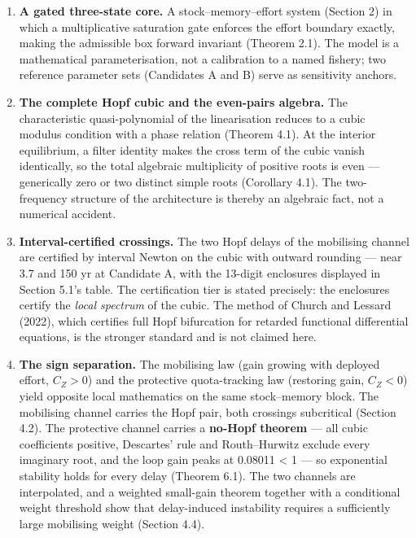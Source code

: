 \documentclass[11pt]{article}
\begin{document}
\begin{enumerate}
\def\labelenumi{\arabic{enumi}.}
\item
  \textbf{A gated three-state core.} A stock--memory--effort system
  (Section 2) in which a multiplicative saturation gate enforces the
  effort boundary exactly, making the admissible box forward invariant
  (Theorem 2.1). The model is a mathematical parameterisation, not a
  calibration to a named fishery; two reference parameter sets
  (Candidates A and B) serve as sensitivity anchors.
\item
  \textbf{The complete Hopf cubic and the even-pairs algebra.} The
  characteristic quasi-polynomial of the linearisation reduces to a
  cubic modulus condition with a phase relation (Theorem 4.1). At the
  interior equilibrium, a filter identity makes the cross term of the
  cubic vanish identically, so the total algebraic multiplicity of
  positive roots is even --- generically zero or two distinct simple
  roots (Corollary 4.1). The two-frequency structure of the architecture
  is thereby an algebraic fact, not a numerical accident.
\item
  \textbf{Interval-certified crossings.} The two Hopf delays of the
  mobilising channel are certified by interval Newton on the cubic with
  outward rounding --- near 3.7 and 150 yr at Candidate A, with the
  13-digit enclosures displayed in Section 5.1's table. The
  certification tier is stated precisely: the enclosures certify the
  \emph{local spectrum} of the cubic. The method of Church and Lessard
  (2022), which certifies full Hopf bifurcation for retarded functional
  differential equations, is the stronger standard and is not claimed
  here.
\item
  \textbf{The sign separation.} The mobilising law (gain growing with
  deployed effort, \(C_Z > 0\)) and the protective quota-tracking law
  (restoring gain, \(C_Z < 0\)) yield opposite local mathematics on the
  same stock--memory block. The mobilising channel carries the Hopf
  pair, both crossings subcritical (Section 4.2). The protective channel
  carries a \textbf{no-Hopf theorem} --- all cubic coefficients
  positive, Descartes' rule and Routh--Hurwitz exclude every imaginary
  root, and the loop gain peaks at 0.08011 \textless{} 1 --- so
  exponential stability holds for every delay (Theorem 6.1). The two
  channels are interpolated, and a weighted small-gain theorem together
  with a conditional weight threshold show that delay-induced
  instability requires a sufficiently large mobilising weight (Section
  4.4).

\end{enumerate}
\end{document}
